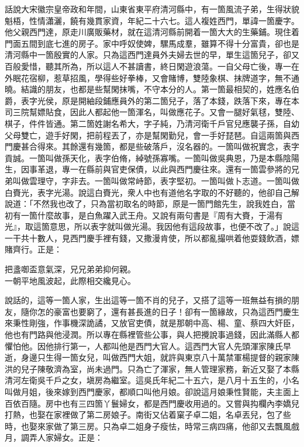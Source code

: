 話說大宋徽宗皇帝政和年間，山東省東平府清河縣中，有一箇風流子弟，生得狀貌魁梧，性情瀟灑，饒有幾貫家資，年紀二十六七。這人複姓西門，單諱一箇慶字。他父親西門達，原走川廣販藥材，就在這清河縣前開着一箇大大的生藥鋪。現住着門面五間到底七進的房子。家中呼奴使婢，騾馬成羣，雖算不得十分富貴，卻也是清河縣中一箇殷實的人家。只為這西門達員外夫婦去世的早，單生這箇兒子，卻又百般愛惜，聽其所為，所以這人不甚讀書，{}終日閑遊浪蕩。一自父母亡後，專一在外眠花宿柳，惹草招風，學得些好拳棒，又會賭博，雙陸象棋、抹牌道字，無不通曉。結識的朋友，也都是些幫閑抹嘴，不守本分的人。第一箇最相契的，姓應名伯爵，表字光侯，原是開紬段鋪應員外的第二箇兒子，落了本錢，跌落下來，專在本司三院幫嫖貼食，因此人都起他一箇渾名，叫做應花子。又會一腿好氣毬，雙陸、棋子，件件皆通。{}第二箇姓謝名希大，字子純，乃清河衛千戶官兒應襲子孫，自幼父母雙亡，遊手好閑，把前程丟了，亦是幫閑勤兒，會一手好琵琶。自這兩箇與西門慶甚合得來。其餘還有幾箇，都是些破落戶，沒名器的。一箇叫做祝實念，表字貢誠。一箇叫做孫天化，表字伯脩，綽號孫寡嘴。一箇叫做吳典恩，乃是本縣陰陽生，因事革退，專一在縣前與官吏保債，以此與西門慶往來。還有一箇雲參將的兄弟叫做雲理守，字非去。一箇叫做常峙節，表字堅初。一箇叫做卜志道。一箇叫做白賚光，表字光湯。說這白賚光，衆人中也有道他名字取的不好聽的，他卻自己解說道：「不然我也改了，只為當初取名的時節，原是一箇門館先生，說我姓白，當初有一箇什麼故事，是白魚躍入武王舟。又說有兩句書是『周有大賚，于湯有光』，取這箇意思，所以表字就叫做光湯。我因他有這段故事，也便不改了。」{}說這一干共十數人，見西門慶手裡有錢，又撒漫肯使，所以都亂撮哄着他耍錢飲酒，嫖賭齊行。正是：

\begin{myquote}
把盞啣盃意氣深，兄兄弟弟抑何親。\\
一朝平地風波起，此際相交纔見心。
\end{myquote}

說話的，這等一箇人家，生出這等一箇不肖的兒子，又搭了這等一班無益有損的朋友，隨你怎的豪富也要窮了，還有甚長進的日子！卻有一箇緣故，只為這西門慶生來秉性剛強，作事機深詭譎，又放官吏債，就是那朝中高、楊、童、蔡四大奸臣，他也有門路與他浸潤。{}所以專在縣裡管些公事，與人把攪說事過錢，因此滿縣人都懼怕他。因他排行第一，人都叫他是西門大官人。這西門大官人先頭渾家陳氏早逝，身邊只生得一箇女兒，叫做西門大姐，就許與東京八十萬禁軍楊提督的親家陳洪的兒子陳敬濟為室，尚未過門。只為亡了渾家，無人管理家務，新近又娶了本縣清河左衛吳千戶之女，塡房為繼室。這吳氏年紀二十五六，是八月十五生的，小名叫做月姐，後來嫁到西門慶家，都順口叫他月娘。卻說這月娘秉性賢能，夫主面上百依百隨。{}房中也有三四箇丫鬟婦女，都是西門慶收用過的。又嘗與抅欄內李嬌兒打熱，也娶在家裡做了第二房娘子。南街又佔着窠子卓二姐，名卓丟兒，包了些時，也娶來家做了第三房。只為卓二姐身子瘦怯，時常三病四痛，他卻又去飄風戲月，調弄人家婦女。正是：

